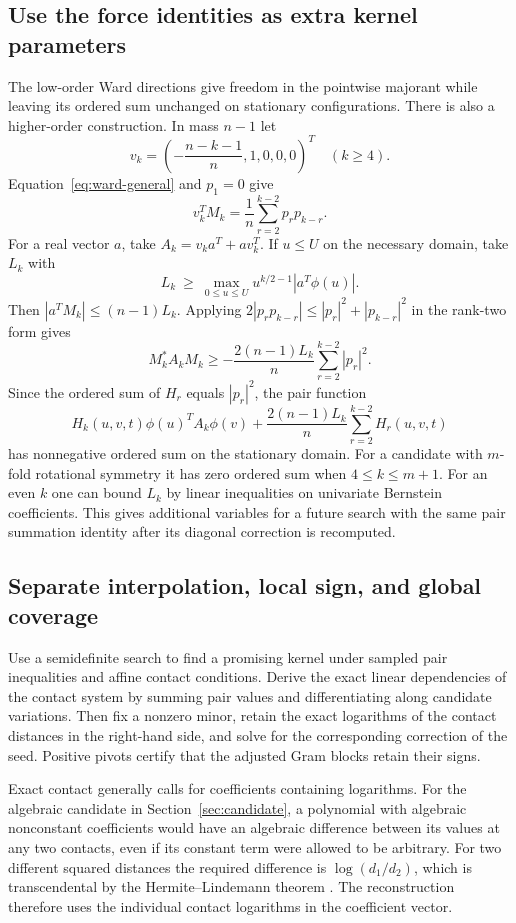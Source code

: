 \documentclass[11pt,letterpaper]{article}
\theoremstyle{remark}
\begin{document}
\subsection{Use the force identities as extra kernel parameters}
The low-order Ward directions give freedom in the pointwise majorant
while leaving its ordered sum unchanged on stationary configurations.
There is also a higher-order construction. In mass \(n-1\) let
\[
 v_k=\left(-\frac{n-k-1}{n},1,0,0,0\right)^T
 \quad (k\ge4).
\]
Equation~\eqref{eq:ward-general} and \(p_1=0\) give
\[
 v_k^T M_k=\frac1n\sum_{r=2}^{k-2}p_rp_{k-r}.
\]
For a real vector \(a\), take \(A_k=v_ka^T+av_k^T\). If \(u\le U\)
on the necessary domain, take \(L_k\) with
\[
 L_k\ \ge\ \max_{0\le u\le U}u^{k/2-1}|a^T\phi(u)|.
\]
Then \(|a^T M_k|\le(n-1)L_k\). Applying
\(2|p_rp_{k-r}|\le |p_r|^2+|p_{k-r}|^2\) in the rank-two form gives
\[
 M_k^*A_kM_k\ge-\frac{2(n-1)L_k}{n}\sum_{r=2}^{k-2}|p_r|^2.
\]
Since the ordered sum of \(H_r\) equals \(|p_r|^2\), the pair function
\[
 H_k(u,v,t)\phi(u)^T A_k\phi(v)
 +\frac{2(n-1)L_k}{n}\sum_{r=2}^{k-2}H_r(u,v,t)
\]
has nonnegative ordered sum on the stationary domain. For a
candidate with \(m\)-fold rotational symmetry it has zero ordered sum
when \(4\le k\le m+1\). For an even \(k\) one can bound \(L_k\) by
linear inequalities on univariate Bernstein coefficients. This gives
additional variables for a future search with the same pair summation
identity after its diagonal correction is recomputed.

\subsection{Separate interpolation, local sign, and global coverage}
Use a semidefinite search to find a promising kernel under sampled
pair inequalities and affine contact conditions. Derive the exact
linear dependencies of the contact system by summing pair values and
differentiating along candidate variations. Then fix a nonzero minor,
retain the exact logarithms of the contact distances in the right-hand
side, and solve for the corresponding correction of the seed.
Positive pivots certify that the adjusted Gram blocks retain their signs.

Exact contact generally calls for coefficients containing logarithms.
For the algebraic candidate in Section~\ref{sec:candidate}, a polynomial
with algebraic nonconstant coefficients would have an algebraic
difference between its values at any two contacts, even if its constant
term were allowed to be arbitrary. For two different squared distances
the required difference is \(\log(d_1/d_2)\), which is transcendental
by the Hermite--Lindemann theorem \cite{lindemann}. The reconstruction
therefore uses the individual contact logarithms in the coefficient
vector.
\end{document}
